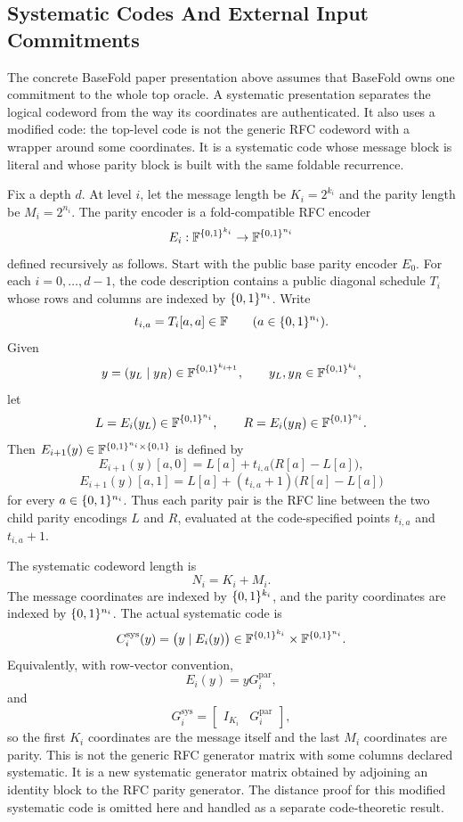 \subsection{Systematic Codes And External Input Commitments}

The concrete BaseFold paper presentation above assumes that BaseFold owns one
commitment to the whole top oracle.  A systematic presentation separates the
logical codeword from the way its coordinates are authenticated.  It also uses a
modified code: the top-level code is not the generic RFC codeword with a wrapper
around some coordinates.  It is a systematic code whose message block is literal
and whose parity block is built with the same foldable recurrence.

Fix a depth $d$.  At level $i$, let the message length be $K_i=2^{k_i}$ and
the parity length be $M_i=2^{n_i}$.  The parity encoder is a fold-compatible RFC
encoder
\[
  E_i:\mathbb{F}^{\{0,1\}^{k_i}}\to\mathbb{F}^{\{0,1\}^{n_i}}
\]
defined recursively as follows.  Start with the public base parity encoder
$E_0$.  For each $i=0,\ldots,d-1$, the code description contains a public
diagonal schedule $T_i$ whose rows and columns are indexed by $\{0,1\}^{n_i}$.
Write
\[
  t_{i,a}=T_i[a,a]\in\mathbb{F}
  \qquad(a\in\{0,1\}^{n_i}).
\]
Given
\[
  y=(y_L\mid y_R)\in\mathbb{F}^{\{0,1\}^{k_{i+1}}},
  \qquad
  y_L,y_R\in\mathbb{F}^{\{0,1\}^{k_i}},
\]
let
\[
  L=E_i(y_L)\in\mathbb{F}^{\{0,1\}^{n_i}},
  \qquad
  R=E_i(y_R)\in\mathbb{F}^{\{0,1\}^{n_i}}.
\]
Then $E_{i+1}(y)\in\mathbb{F}^{\{0,1\}^{n_i}\times\{0,1\}}$ is defined by
\[
  E_{i+1}(y)[a,0]
  =
  L[a]+t_{i,a}\bigl(R[a]-L[a]\bigr),
\]
\[
  E_{i+1}(y)[a,1]
  =
  L[a]+(t_{i,a}+1)\bigl(R[a]-L[a]\bigr)
\]
for every $a\in\{0,1\}^{n_i}$.  Thus each parity pair is the RFC line between the
two child parity encodings $L$ and $R$, evaluated at the code-specified points
$t_{i,a}$ and $t_{i,a}+1$.

The systematic codeword length is
\[
  N_i=K_i+M_i.
\]
The message coordinates are indexed by $\{0,1\}^{k_i}$, and the parity coordinates
are indexed by $\{0,1\}^{n_i}$.  The actual systematic code is
\[
  C_i^{\mathrm{sys}}(y)
  =
  \bigl(y\mid E_i(y)\bigr)
  \in
  \mathbb{F}^{\{0,1\}^{k_i}}\times\mathbb{F}^{\{0,1\}^{n_i}}.
\]
Equivalently, with row-vector convention,
\[
  E_i(y)=yG_i^{\mathrm{par}},
\]
and
\[
  G_i^{\mathrm{sys}}
  =
  \begin{bmatrix}
    I_{K_i} & G_i^{\mathrm{par}}
  \end{bmatrix},
\]
so the first $K_i$ coordinates are the message itself and the last $M_i$
coordinates are parity.  This is not the generic RFC generator matrix with some
columns declared systematic.  It is a new systematic generator matrix obtained
by adjoining an identity block to the RFC parity generator.  The distance proof
for this modified systematic code is omitted here and handled as a separate
code-theoretic result.

